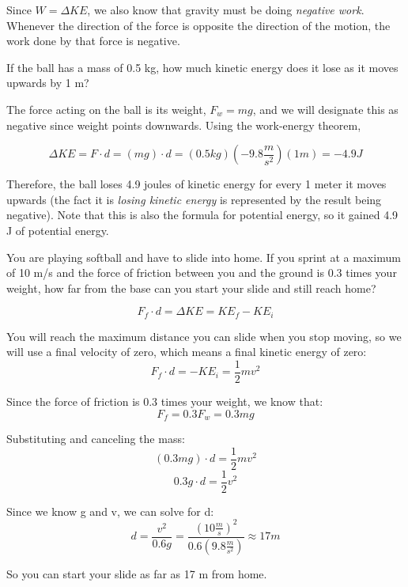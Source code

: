 Since $W = \Delta KE$, we also know that gravity must be doing \textit{negative 
work}. Whenever the direction of the force is opposite the direction of the 
motion, the work done by that force is negative. 
\begin{Exercise}[title=A ball thrown upwards, label=ball_energy]
If the ball has a mass of 0.5 kg, how much kinetic energy does it lose as it moves upwards by 1 m?
\end{Exercise}
\begin{Answer}[ref=ball_energy]
The force acting on the ball is its weight, $F_w = mg$, and we 
will designate this as negative since weight points downwards. Using the 
work-energy theorem, 

$$\Delta KE = F \cdot d = \left( mg \right) \cdot d = \left( 0.5 kg \right) \left(
-9.8 \frac{m}{s^2} \right) \left( 1 m \right) = -4.9 J$$

Therefore, the ball loses 4.9 joules of kinetic energy for every 1 meter it moves 
upwards (the fact it is \textit{losing kinetic energy} is represented by the 
result being negative). Note that this is also the formula for potential energy, so it gained 4.9 J of potential energy.
\end{Answer}

\begin{Exercise}[title = {How far will you slide?}, label = slide]
You are playing softball and have to slide into home. If you sprint at a maximum 
of 10 m/s and the force of friction between you and the ground is 0.3 times your 
weight, how far from the base can you start your slide and still reach home?
\end{Exercise}

\begin{Answer}[ref = slide]
$$F_f \cdot d = \Delta KE = KE_f - KE_i$$

You will reach the maximum distance you can slide when you stop moving, so we will 
use a final velocity of zero, which means a final kinetic energy of zero:
$$F_f \cdot d = -KE_i = \frac{1}{2}mv^2$$

Since the force of friction is 0.3 times your weight, we know that:
$$F_f = 0.3 F_w = 0.3mg$$

Substituting and canceling the mass:
$$\left( 0.3 mg \right) \cdot d = \frac{1}{2}mv^2$$
$$0.3g \cdot d = \frac{1}{2}v^2$$

Since we know g and v, we can solve for d:
$$d = \frac{v^2}{0.6g} = \frac{\left( 10 \frac{m}{s} \right)^2}{0.6 \left( 9.8 
\frac{m}{s^2} \right)} \approx 17 m$$

So you can start your slide as far as 17 m from home.
\end{Answer}

